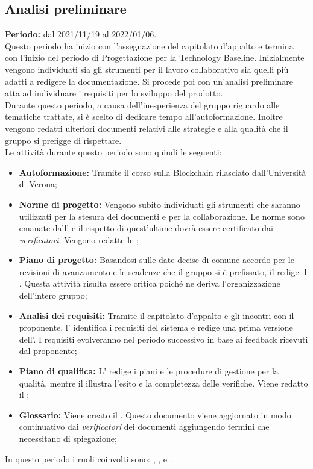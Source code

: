 \subsection{Analisi preliminare} \label{subsection:pianificazione_Analisi}
\textbf{Periodo:} dal 2021/11/19 al 2022/01/06.
\bigskip
\\Questo periodo ha inizio con l'assegnazione del capitolato d'appalto e termina con l'inizio del periodo di Progettazione per la Technology Baseline\glo{}.
Inizialmente vengono individuati sia gli strumenti per il lavoro collaborativo sia quelli più adatti a redigere la documentazione.
Si procede poi con un'analisi preliminare atta ad individuare i requisiti per lo sviluppo del prodotto.
\\Durante questo periodo, a causa dell'inesperienza del gruppo riguardo alle tematiche trattate, si è scelto di dedicare tempo all'autoformazione.
Inoltre vengono redatti ulteriori documenti relativi alle strategie e alla qualità che il gruppo \groupName{} si prefigge di rispettare.
\\Le attività durante questo periodo sono quindi le seguenti:
\begin{itemize}
  \item \textbf{Autoformazione:} Tramite il corso sulla Blockchain\glo{} rilasciato dall'Università di Verona;
  \item \textbf{Norme di progetto:} Vengono subito individuati gli strumenti che saranno utilizzati per la stesura dei documenti e per la collaborazione.
  Le norme sono emanate dall'\roleAdministratorLow{} e il rispetto di quest'ultime dovrà essere certificato dai \textit{verificatori}. Vengono redatte le \docNameNdP{};
  \item \textbf{Piano di progetto:} Basandosi sulle date decise di comune accordo per le revisioni di avanzamento e le scadenze che il gruppo si è prefissato, il \roleProjectManager{} redige il \docNamePdP{}.
  Questa attività risulta essere critica poiché ne deriva l'organizzazione dell'intero gruppo;
  \item \textbf{Analisi dei requisiti:} Tramite il capitolato d'appalto e gli incontri con il proponente, l'\roleAnalystLow{} identifica i requisiti del sistema e redige una prima versione dell'\docNameAdR{}.
  I requisiti evolveranno nel periodo successivo in base ai feedback ricevuti dal proponente;
  \item \textbf{Piano di qualifica:} L'\roleAdministratorLow{} redige i piani e le procedure di gestione per la qualità, mentre il \roleVerifierLow{} illustra l'esito e la completezza delle verifiche. Viene redatto il \docNamePdQ{};
  \item \textbf{Glossario:} Viene creato il \docNameGlo{}. Questo documento viene aggiornato in modo continuativo dai \textit{verificatori} dei documenti aggiungendo termini che necessitano di spiegazione;
\end{itemize}
In questo periodo i ruoli coinvolti sono: \roleProjectManagerLow{}, \roleAdministratorLow{}, \roleAnalystLow{} e \roleVerifierLow{}.

